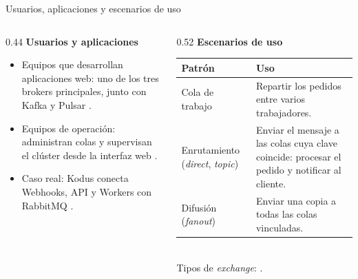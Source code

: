 \begin{frame}{Usuarios, aplicaciones y escenarios de uso}
  \begin{columns}[T]
    \begin{column}{0.44\textwidth}
      \textbf{Usuarios y aplicaciones}
      \begin{itemize}
        \item Equipos que desarrollan aplicaciones web: uno de los tres
              brokers principales, junto con Kafka y Pulsar
              \cite{dyjach2024brokers}.
        \item Equipos de operación: administran colas y supervisan el
              clúster desde la interfaz web \cite{fu2021fair}.
        \item Caso real: Kodus conecta Webhooks, API y Workers con
              RabbitMQ \cite{malinosqui2026kodus}.
      \end{itemize}
    \end{column}
    \begin{column}{0.52\textwidth}
      \textbf{Escenarios de uso}\\[0.1cm]
      \small
      \begin{tabularx}{\linewidth}{@{}p{2.4cm}X@{}}
        \toprule
        Patrón & Uso \\
        \midrule
        \raggedright Cola de trabajo & Repartir los pedidos entre varios
          trabajadores. \\
        \raggedright Enrutamiento (\textit{direct}, \textit{topic}) & Enviar
          el mensaje a las colas cuya clave coincide: procesar el pedido y
          notificar al cliente. \\
        \raggedright Difusión (\textit{fanout}) & Enviar una copia a todas
          las colas vinculadas. \\
        \bottomrule
      \end{tabularx}\\[0.1cm]
      {\tiny Tipos de \textit{exchange}: \cite{rabbitmq2026amqp}.}
    \end{column}
  \end{columns}
\end{frame}

